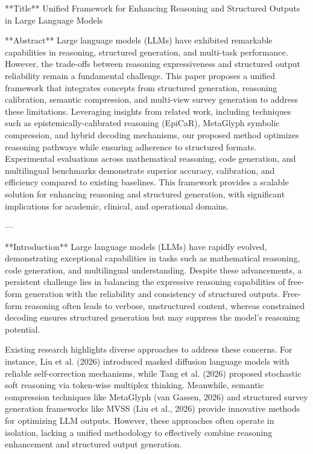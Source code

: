 **Title**  
Unified Framework for Enhancing Reasoning and Structured Outputs in Large Language Models  

**Abstract**  
Large language models (LLMs) have exhibited remarkable capabilities in reasoning, structured generation, and multi-task performance. However, the trade-offs between reasoning expressiveness and structured output reliability remain a fundamental challenge. This paper proposes a unified framework that integrates concepts from structured generation, reasoning calibration, semantic compression, and multi-view survey generation to address these limitations. Leveraging insights from related work, including techniques such as epistemically-calibrated reasoning (EpiCaR), MetaGlyph symbolic compression, and hybrid decoding mechanisms, our proposed method optimizes reasoning pathways while ensuring adherence to structured formats. Experimental evaluations across mathematical reasoning, code generation, and multilingual benchmarks demonstrate superior accuracy, calibration, and efficiency compared to existing baselines. This framework provides a scalable solution for enhancing reasoning and structured generation, with significant implications for academic, clinical, and operational domains.  

---

**Introduction**  
Large language models (LLMs) have rapidly evolved, demonstrating exceptional capabilities in tasks such as mathematical reasoning, code generation, and multilingual understanding. Despite these advancements, a persistent challenge lies in balancing the expressive reasoning capabilities of free-form generation with the reliability and consistency of structured outputs. Free-form reasoning often leads to verbose, unstructured content, whereas constrained decoding ensures structured generation but may suppress the model’s reasoning potential.  

Existing research highlights diverse approaches to address these concerns. For instance, Liu et al. (2026) introduced masked diffusion language models with reliable self-correction mechanisms, while Tang et al. (2026) proposed stochastic soft reasoning via token-wise multiplex thinking. Meanwhile, semantic compression techniques like MetaGlyph (van Gassen, 2026) and structured survey generation frameworks like MVSS (Liu et al., 2026) provide innovative methods for optimizing LLM outputs. However, these approaches often operate in isolation, lacking a unified methodology to effectively combine reasoning enhancement and structured output generation.  

